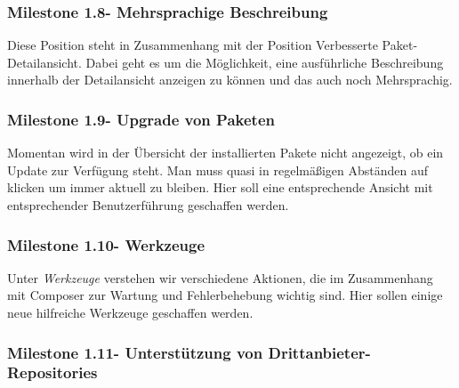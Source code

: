 \documentclass[
paper=a4,
draft=false,%
fontsize=10pt%
]{scrartcl}
\begin{document}
\pagebreak

\subsubsection[Milestone 1.8 - Mehrsprachige Beschreibung]{Milestone 1.8\footnotemark - Mehrsprachige Beschreibung}
\label{subsec:ccc-milestone-1.8}

Diese Position steht in Zusammenhang mit der Position Verbesserte Paket-Detailansicht. Dabei geht es um die Möglichkeit, eine ausführliche Beschreibung innerhalb der Detailansicht anzeigen zu können und das auch noch Mehrsprachig.

\subsubsection[Milestone 1.9 - Upgrade von Paketen]{Milestone 1.9\footnotemark - Upgrade von Paketen}
\label{subsec:ccc-milestone-1.9}

Momentan wird in der Übersicht der installierten Pakete nicht angezeigt, ob ein Update zur Verfügung steht. Man muss quasi in regelmäßigen Abständen auf  klicken um immer aktuell zu bleiben. Hier soll eine entsprechende Ansicht mit entsprechender Benutzerführung geschaffen werden.

\subsubsection[Milestone 1.10 - Werkzeuge]{Milestone 1.10\footnotemark - Werkzeuge}
\label{subsec:ccc-milestone-1.10}

Unter \emph{Werkzeuge} verstehen wir verschiedene Aktionen, die im Zusammenhang mit Composer zur Wartung und Fehlerbehebung wichtig sind. Hier sollen einige neue hilfreiche Werkzeuge geschaffen werden.

\subsubsection[Milestone 1.11 - Unterstützung von Drittanbieter-Repositories]{Milestone 1.11\footnotemark - Unterstützung von Drittanbieter-Repositories}
\label{subsec:ccc-milestone-1.11}
\end{document}
